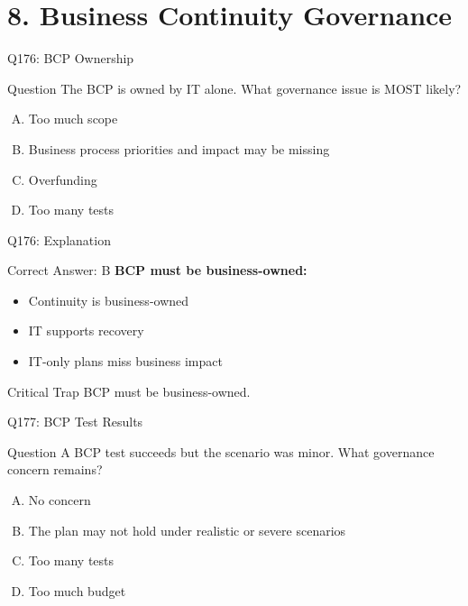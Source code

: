 \documentclass{beamer}
\begin{document}
	\section{8. Business Continuity Governance}
	
	\begin{frame}{Q176: BCP Ownership}
		\begin{block}{Question}
			The BCP is owned by IT alone. What governance issue is MOST likely?
		\end{block}
		\begin{enumerate}[(A)]
			\item Too much scope
			\item Business process priorities and impact may be missing
			\item Overfunding
			\item Too many tests
		\end{enumerate}
	\end{frame}
	
	\begin{frame}{Q176: Explanation}
		\begin{block}{Correct Answer: B}
			\textbf{BCP must be business-owned:}
			\begin{itemize}
				\item Continuity is business-owned
				\item IT supports recovery
				\item IT-only plans miss business impact
			\end{itemize}
		\end{block}
		\begin{alertblock}{Critical Trap}
			BCP must be business-owned.
		\end{alertblock}
	\end{frame}
	
	\begin{frame}{Q177: BCP Test Results}
		\begin{block}{Question}
			A BCP test succeeds but the scenario was minor. What governance concern remains?
		\end{block}
		\begin{enumerate}[(A)]
			\item No concern
			\item The plan may not hold under realistic or severe scenarios
			\item Too many tests
			\item Too much budget
		\end{enumerate}
	\end{frame}
	
\end{document}

